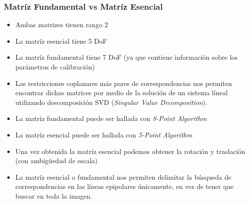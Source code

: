 \begin{frame}
    
\end{frame}

\begin{frame}
    \frametitle{Matríz Fundamental vs Matríz Esencial}
    \footnotesize
    
    \begin{itemize}
        \item Ambas matrizes tienen rango 2
        \item La matríz esencial tiene 5 DoF
        \item La matríz fundamental tiene 7 DoF (ya que contiene información sobre los parámetros de calibración)
        \item Las restricciones coplanares más pares de correspondencias nos permiten encontrar dichas matrices por medio de la solución de un sistema líneal utilizando descomposición SVD (\emph{Singular Value Decomposition}).
        \item La matríz fundamental puede ser hallada con \emph{8-Point Algorithm}
        \item La matríz esencial puede ser hallada con \emph{5-Point Algorithm}
        \item Una vez obtenida la matríz esencial podemos obtener la rotación y traslación (con ambig{\"u}edad de escala)
        \item La matríz esencial o fundamental nos permiten delimitar la búsqueda de correspondencias en las líneas epipolares únicamente, en vez de tener que buscar en toda la imagen.
    \end{itemize}
   
\end{frame}

